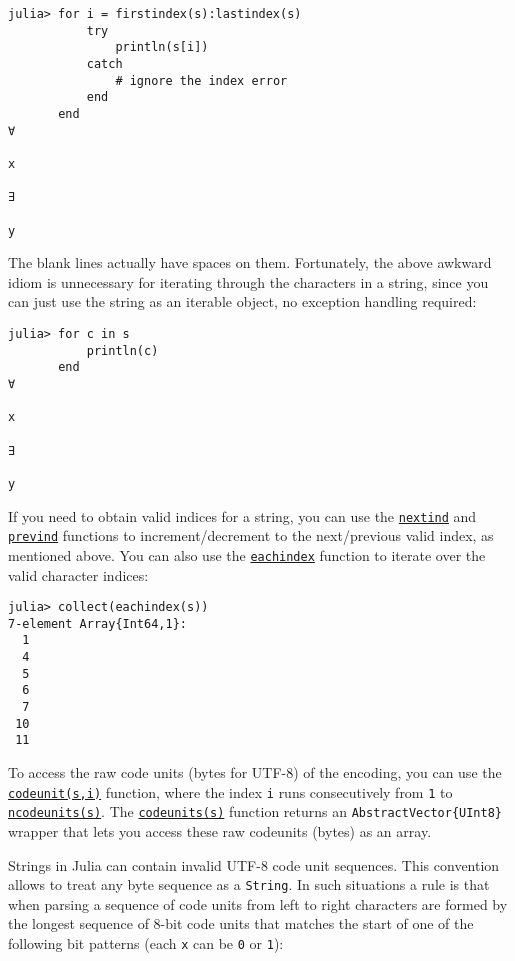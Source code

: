 \begin{verbatim}
julia> for i = firstindex(s):lastindex(s)
           try
               println(s[i])
           catch
               # ignore the index error
           end
       end
∀

x

∃

y
\end{verbatim}



The blank lines actually have spaces on them. Fortunately, the above awkward idiom is unnecessary for iterating through the characters in a string, since you can just use the string as an iterable object, no exception handling required:




\begin{verbatim}
julia> for c in s
           println(c)
       end
∀

x

∃

y
\end{verbatim}



If you need to obtain valid indices for a string, you can use the \hyperlink{7455293228649070526}{\texttt{nextind}} and \hyperlink{15871508897466976220}{\texttt{prevind}} functions to increment/decrement to the next/previous valid index, as mentioned above. You can also use the \hyperlink{4701773772897287974}{\texttt{eachindex}} function to iterate over the valid character indices:




\begin{verbatim}
julia> collect(eachindex(s))
7-element Array{Int64,1}:
  1
  4
  5
  6
  7
 10
 11
\end{verbatim}



To access the raw code units (bytes for UTF-8) of the encoding, you can use the \hyperlink{16983098119361955361}{\texttt{codeunit(s,i)}} function, where the index \texttt{i} runs consecutively from \texttt{1} to \hyperlink{1775518749150675445}{\texttt{ncodeunits(s)}}.  The \hyperlink{17283482973786973382}{\texttt{codeunits(s)}} function returns an \texttt{AbstractVector\{UInt8\}} wrapper that lets you access these raw codeunits (bytes) as an array.



Strings in Julia can contain invalid UTF-8 code unit sequences. This convention allows to treat any byte sequence as a \texttt{String}. In such situations a rule is that when parsing a sequence of code units from left to right characters are formed by the longest sequence of 8-bit code units that matches the start of one of the following bit patterns (each \texttt{x} can be \texttt{0} or \texttt{1}):



